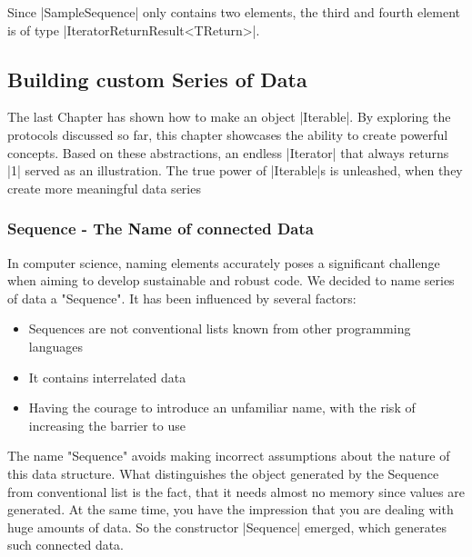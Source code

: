 Since |SampleSequence| only contains two elements, the third and fourth element
is of type |IteratorReturnResult<TReturn>|.

\subsection{Building custom Series of Data}
\label{sub:Building custom Series of Data}
The last Chapter has shown how to make an object |Iterable|. By exploring the 
protocols discussed so far, this chapter showcases the ability to create 
powerful concepts. Based on these abstractions, an endless |Iterator| that always
returns |1| served as an illustration. The true power of |Iterable|s is 
unleashed, when they create more meaningful data series
\subsubsection{Sequence - The Name of connected Data}
\label{subsub:Sequence - The Name of connected Data}
In computer science, naming elements accurately poses a significant challenge 
when aiming to develop sustainable and robust code. We decided to name series
of data a "Sequence". It has been influenced by several factors:

\begin{itemize}
  \item{Sequences are not conventional lists known from other programming languages}
  \item{It contains interrelated data}
  \item{Having the courage to introduce an unfamiliar name, with the risk of increasing the barrier to use}
\end{itemize}

The name "Sequence" avoids making incorrect assumptions about the nature of
this data structure.
\newline
What distinguishes the object generated by the Sequence from conventional list
is the fact, that it needs almost no memory since values are generated. At the 
same time, you have the impression that you are dealing with huge amounts of data.
So the constructor |Sequence| emerged, which generates such connected data.

